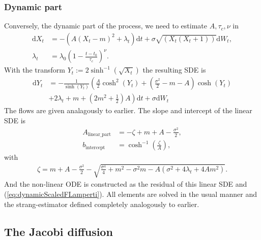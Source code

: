 \subsubsection{Dynamic part}
Conversely, the dynamic part of the process, we need to estimate $A, \tau_c, \nu$ in
\begin{align}
    \mathrm{d}X_t &= -\left(A(X_t - m)^2 + \lambda_t\right)\mathrm{d}t + \sigma \sqrt{\left(X_t\left(X_t + 1\right)\right)}\mathrm{d}W_t,\\
    \lambda_t &= \lambda_0 \left(1 - \frac{t - t_0}{\tau_c}\right)^\nu.
\end{align}
With the transform $Y_t := 2\sinh^{-1}\left(\sqrt{X_t}\right)$ the resulting SDE is 
\begin{align}
    \mathrm{d}Y_t &= - \frac{1}{\sinh\left(Y_t\right)}\left(\frac{A}{2}\cosh^2(Y_t) + \left(\frac{\sigma^2}{2} - m - A\right)\cosh(Y_t) \right. \nonumber \\ 
    &+\left. 2\lambda_t + m + \left(2m^2 + \frac{1}{2}\right)A\right)\mathrm{d}t + \sigma \mathrm{d}W_t \label{eq:dynamicScaledFLamperti}
\end{align}
The flows are given analagously to earlier. The slope and intercept of the linear SDE is
\begin{align}
    A_{\mathrm{linear\_part}} &= -\zeta + m + A - \frac{\sigma^2}{2},\\
    b_{\mathrm{intercept}} &= \cosh^{-1}\left(\frac{\zeta}{A}\right),
\end{align}
with
\begin{align}
    \zeta = m + A - \frac{\sigma^2}{2} - \sqrt{\frac{\sigma^4}{4} + m^2 - \sigma^2m - A\left(\sigma^2 + 4 \lambda_t + 4 A m^2\right)}.
\end{align}
And the non-linear ODE is constructed as the residual of this linear SDE and (\ref{eq:dynamicScaledFLamperti}). All elements are solved in the usual manner and the strang-estimator defined completely analogously to earlier.
\subsection{The Jacobi diffusion}
